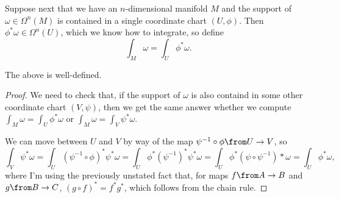 Suppose next that we have an $n$-dimensional manifold $M$ and the support of $\omega \in \Omega^n(M)$ is contained in a single coordinate chart $(U,\phi)$. Then $\phi^\ast \omega \in \Omega^n(U)$, which we know how to integrate, so define
\[
	\int_M\omega = \int_U \phi^\ast \omega.
\]

\begin{proposition}\label{prop:local integral well-defined}
	The above is well-defined.
\end{proposition}

\begin{proof}
	We need to check that, if the support of $\omega$ is also containd in some other coordinate chart $(V, \psi)$, then we get the same answer whether we compute $\int_M \omega = \int_U \phi^\ast \omega$ or $\int_M \omega = \int_V \psi^\ast \omega$.
	
	We can move between $U$ and $V$ by way of the map $\psi^{-1} \circ \phi \from U \to V$, so
	\[
		\int_V \psi^\ast \omega = \int_U(\psi^{-1} \circ \phi)^\ast \psi^\ast \omega = \int_U \phi^\ast (\psi^{-1})^\ast \psi^\ast \omega = \int_U \phi^\ast (\psi \circ \psi^{-1})\ast \omega = \int_U \phi^\ast \omega ,
	\]
	where I'm using the previously unstated fact that, for maps $f \from A \to B$ and $g \from B \to C$, $(g \circ f)^\ast = f^\ast g^\ast$, which follows from the chain rule.
\end{proof}